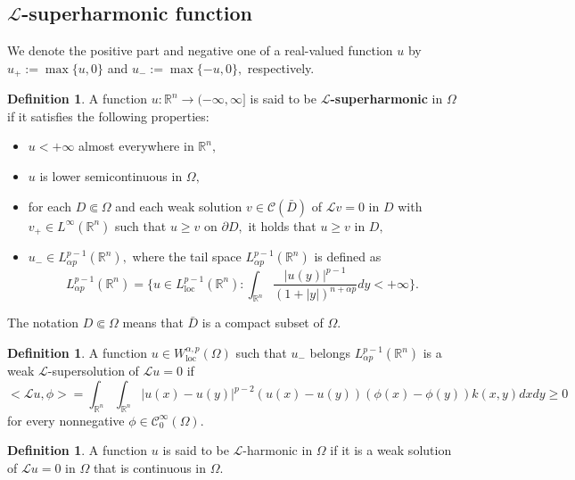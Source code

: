\documentclass[12pt]{amsart}
\newcommand{\R}{\mathbb{R}}
\numberwithin{equation}{section}
\theoremstyle{plain}
\theoremstyle{definition}
\newtheorem{Def}[Thm]{Definition}
\theoremstyle{remark}
\begin{document}
\subsection*{$\mathcal{L}$-superharmonic function}


We denote the positive part and negative one of a real-valued function $u$ by $u_{+}:=\max\{u,0\}$ and $u_{-}:=\max\{-u,0\},$ respectively.


\begin{Def}
A function $u:\R^{n}\to (-\infty,\infty]$ is said to be \textbf{$\mathcal{L}$-superharmonic} in $\Omega$ if it satisfies the following properties:
\begin{itemize}
\item[(i)] $u<+\infty$ almost everywhere in $\R^{n},$
\item[(ii)] $u$ is lower semicontinuous in $\Omega,$
\item[(iii)] for each $D\Subset\Omega$ and each weak solution $v \in \mathcal{C}(\bar{D})$ of $\mathcal{L}v=0$ in $D$ with $v_{+}\in L^{\infty}(\R^{n})$ such that $u\geq v$ on $\partial D,$ it holds that $u\geq v$ in $D,$
\item[(iv)] $u_{-}\in L^{p-1}_{\alpha p}(\R^{n}),$ where the tail space $L^{p-1}_{\alpha p}(\R^{n})$  is defined as 
\[
 L^{p-1}_{\alpha p}(\R^{n})=\Big\{u\in L^{p-1}_{\text{loc}}(\R^{n}):  \int_{\R^{n}} \frac{|u(y)|^{p-1}}{(1+|y|)^{n+\alpha p}} dy <+\infty    \Big\}.
 \]
\end{itemize}
\end{Def}
The notation $D\Subset \Omega$ means that $\bar{D}$ is a compact subset of $\Omega$. 



 
\begin{Def}
A function $u\in W_{\text{loc}}^{\alpha,p}(\Omega)$ such that $u_{-}$ belongs $L^{p-1}_{\alpha p}(\R^{n})$ is a weak $\mathcal{L}$-supersolution of $\mathcal{L}u=0$
if
\[
<\mathcal{L}u,\phi>=\int_{\R^{n}}\int_{\R^{n}} |u(x)-u(y)|^{p-2}(u(x)-u(y)) (\phi(x)-\phi(y)) k(x,y) dxdy\geq 0
\]
for every nonnegative $\phi\in\mathcal{C}^{\infty}_{0}(\Omega).$
\end{Def}
\begin{Def}
A function $u$ is said to be $\mathcal{L}$-harmonic in $\Omega$ if it is a weak solution of $\mathcal{L}u=0$ in $\Omega$ that is continuous in $\Omega$.
\end{Def}
\end{document}
